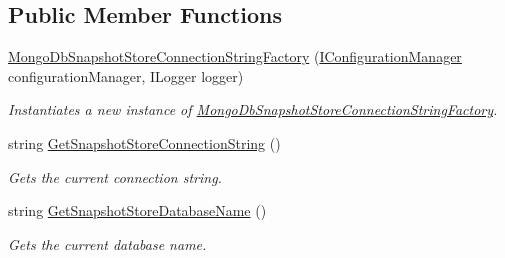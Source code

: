 \subsection*{Public Member Functions}
\begin{DoxyCompactItemize}
\item 
\hyperlink{classCqrs_1_1MongoDB_1_1Events_1_1MongoDbSnapshotStoreConnectionStringFactory_a6fcf4743adc439f88a8a443095a3ab5c_a6fcf4743adc439f88a8a443095a3ab5c}{Mongo\+Db\+Snapshot\+Store\+Connection\+String\+Factory} (\hyperlink{interfaceCqrs_1_1Configuration_1_1IConfigurationManager}{I\+Configuration\+Manager} configuration\+Manager, I\+Logger logger)
\begin{DoxyCompactList}\small\item\em Instantiates a new instance of \hyperlink{classCqrs_1_1MongoDB_1_1Events_1_1MongoDbSnapshotStoreConnectionStringFactory}{Mongo\+Db\+Snapshot\+Store\+Connection\+String\+Factory}. \end{DoxyCompactList}\item 
string \hyperlink{classCqrs_1_1MongoDB_1_1Events_1_1MongoDbSnapshotStoreConnectionStringFactory_abe5f66b50fd726fac198836a54e8437b_abe5f66b50fd726fac198836a54e8437b}{Get\+Snapshot\+Store\+Connection\+String} ()
\begin{DoxyCompactList}\small\item\em Gets the current connection string. \end{DoxyCompactList}\item 
string \hyperlink{classCqrs_1_1MongoDB_1_1Events_1_1MongoDbSnapshotStoreConnectionStringFactory_ac7887125d11922bce590cc541fc84e62_ac7887125d11922bce590cc541fc84e62}{Get\+Snapshot\+Store\+Database\+Name} ()
\begin{DoxyCompactList}\small\item\em Gets the current database name. \end{DoxyCompactList}\end{DoxyCompactItemize}
